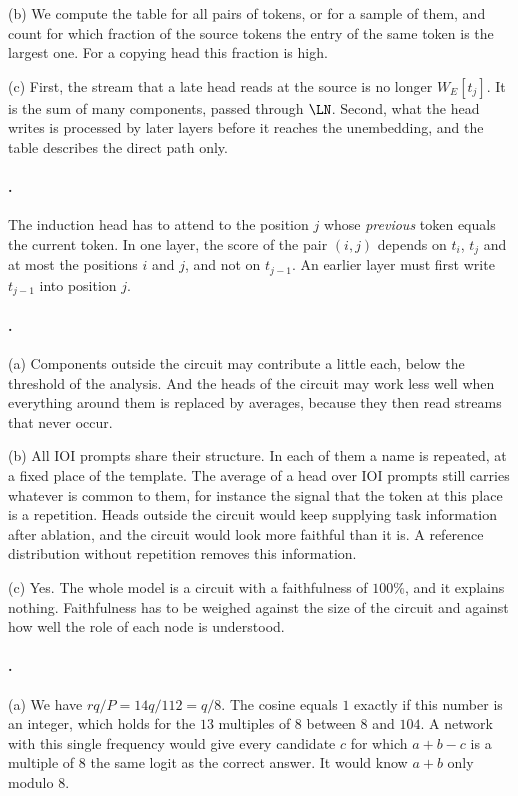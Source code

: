 {(b) We compute the table for all pairs of tokens, or for a sample of them, and count for which fraction of the
source tokens the entry of the same token is the largest one. For a copying head this fraction is high.

(c) First, the stream that a late head reads at the source is no longer $W_E[t_j]$. It is the sum of many
components, passed through $\LN$. Second, what the head writes is processed by later layers before it reaches
the unembedding, and the table describes the direct path only.

\paragraph{.}
The induction head has to attend to the position $j$ whose \emph{previous} token equals the current token. In one
layer, the score of the pair $(i,j)$ depends on $t_i$, $t_j$ and at most the positions $i$ and $j$, and not on
$t_{j-1}$. An earlier layer must first write $t_{j-1}$ into position $j$.

\paragraph{.}
(a) Components outside the circuit may contribute a little each, below the threshold of the analysis. And the
heads of the circuit may work less well when everything around them is replaced by averages, because they then
read streams that never occur.

(b) All IOI prompts share their structure. In each of them a name is repeated, at a fixed place of the template.
The average of a head over IOI prompts still carries whatever is common to them, for instance the signal that the
token at this place is a repetition. Heads outside the circuit would keep supplying task information after
ablation, and the circuit would look more faithful than it is. A reference distribution without repetition
removes this information.

(c) Yes. The whole model is a circuit with a faithfulness of $100\%$, and it explains nothing. Faithfulness has to
be weighed against the size of the circuit and against how well the role of each node is understood.

\paragraph{.}
(a) We have $rq/P=14q/112=q/8$. The cosine equals $1$ exactly if this number is an integer, which holds for the
$13$ multiples of $8$ between $8$ and $104$. A network with this single frequency would give every candidate $c$
for which $a+b-c$ is a multiple of $8$ the same logit as the correct answer. It would know $a+b$ only modulo $8$.

}
